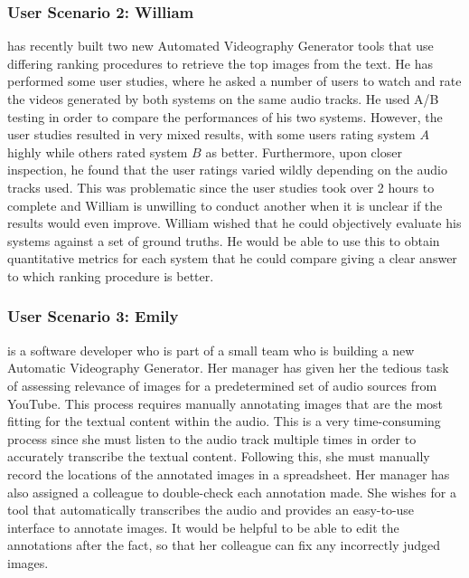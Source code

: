 \documentclass{l4proj}
\begin{document}
\subsubsection{User Scenario 2: William} has recently built two new Automated Videography Generator tools that use differing ranking procedures to retrieve the top images from the text. He has performed some user studies, where he asked a number of users to watch and rate the videos generated by both systems on the same audio tracks. He used A/B testing in order to compare the performances of his two systems. However, the user studies resulted in very mixed results, with some users rating system $A$ highly while others rated system $B$ as better. Furthermore, upon closer inspection, he found that the user ratings varied wildly depending on the audio tracks used. This was problematic since the user studies took over 2 hours to complete and William is unwilling to conduct another when it is unclear if the results would even improve. William wished that he could objectively evaluate his systems against a set of ground truths. He would be able to use this to obtain quantitative metrics for each system that he could compare giving a clear answer to which ranking procedure is better.

\subsubsection{User Scenario 3: Emily} is a software developer who is part of a small team who is building a new Automatic Videography Generator. Her manager has given her the tedious task of assessing relevance of images for a predetermined set of audio sources from YouTube. This process requires manually annotating images that are the most fitting for the textual content within the audio. This is a very time-consuming process since she must listen to the audio track multiple times in order to accurately transcribe the textual content. Following this, she must manually record the locations of the annotated images in a spreadsheet. Her manager has also assigned a colleague to double-check each annotation made. She wishes for a tool that automatically transcribes the audio and provides an easy-to-use interface to annotate images. It would be helpful to be able to edit the annotations after the fact, so that her colleague can fix any incorrectly judged images. 
\end{document}
